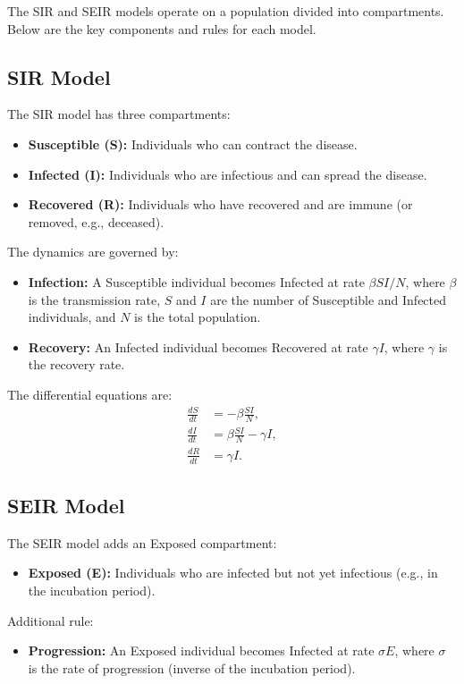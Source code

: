\documentclass{article}
\begin{document}
The SIR and SEIR models operate on a population divided into compartments. Below are the key components and rules for each model.

\subsection{SIR Model}
The SIR model has three compartments:
\begin{itemize}
    \item \textbf{Susceptible (S):} Individuals who can contract the disease.
    \item \textbf{Infected (I):} Individuals who are infectious and can spread the disease.
    \item \textbf{Recovered (R):} Individuals who have recovered and are immune (or removed, e.g., deceased).
\end{itemize}

The dynamics are governed by:
\begin{itemize}
    \item \textbf{Infection:} A Susceptible individual becomes Infected at rate $\beta SI/N$, where $\beta$ is the transmission rate, $S$ and $I$ are the number of Susceptible and Infected individuals, and $N$ is the total population.
    \item \textbf{Recovery:} An Infected individual becomes Recovered at rate $\gamma I$, where $\gamma$ is the recovery rate.
\end{itemize}

The differential equations are:
\begin{align}
    \frac{dS}{dt} &= -\beta \frac{SI}{N}, \\
    \frac{dI}{dt} &= \beta \frac{SI}{N} - \gamma I, \\
    \frac{dR}{dt} &= \gamma I.
\end{align}

\subsection{SEIR Model}
The SEIR model adds an Exposed compartment:
\begin{itemize}
    \item \textbf{Exposed (E):} Individuals who are infected but not yet infectious (e.g., in the incubation period).
\end{itemize}

Additional rule:
\begin{itemize}
    \item \textbf{Progression:} An Exposed individual becomes Infected at rate $\sigma E$, where $\sigma$ is the rate of progression (inverse of the incubation period).
\end{itemize}
\end{document}
